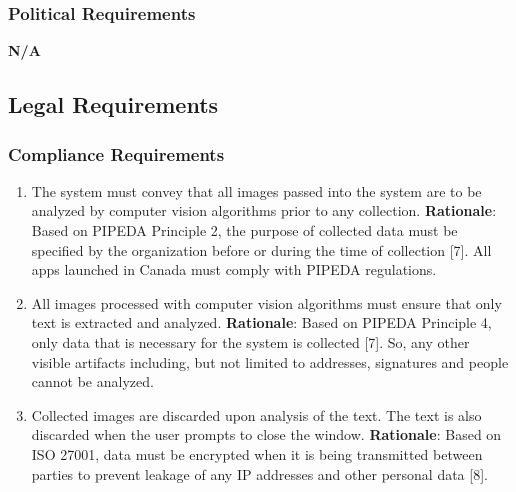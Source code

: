 \subsubsection{Political Requirements}
\label{ssub:political_requirements}
\textbf{N/A}


\subsection{Legal Requirements}
\label{sub:legal_requirements}

\subsubsection{Compliance Requirements}
\label{ssub:compliance_requirements}
\begin{enumerate}[{LR-COMP}1. ]
	\item The system must convey that all images passed into the system are to be analyzed by computer vision algorithms prior to any collection.
	\textbf{Rationale}: Based on PIPEDA Principle 2, the purpose of collected data must be specified by the organization before or during the time of collection [7]. All apps launched in Canada must comply with PIPEDA regulations.
	\item All images processed with computer vision algorithms must ensure that only text is extracted and analyzed.
	\textbf{Rationale}: Based on PIPEDA Principle 4, only data that is necessary for the system is collected [7]. So, any other visible artifacts including, but not limited to addresses, signatures and people cannot be analyzed.
	\item Collected images are discarded upon analysis of the text. The text is also discarded when the user prompts to close the window.
	\textbf{Rationale}: Based on ISO 27001, data must be encrypted when it is being transmitted between parties to prevent leakage of any IP addresses and other personal data [8].
\end{enumerate}


